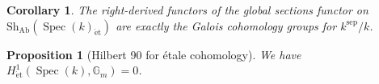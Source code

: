 \documentclass{article}
\numberwithin{equation}{section}
\numberwithin{figure}{section}
\newcommand{\G}{\mathbb{G}}
\newcommand{\Spec}{\mathop{\mathrm{Spec}}}
\newcommand{\et}{\acute{\mathrm{e}}\mathrm{t}}
\newcommand{\sep}{\mathrm{sep}}
\newcommand{\Ab}{\mathrm{Ab}}
\newcommand{\Sh}{\mathrm{Sh}}
\theoremstyle{plain}
\newtheorem{prop}[thm]{Proposition}
\newtheorem{cor}[thm]{Corollary}
\theoremstyle{definition}
\theoremstyle{remark}
\begin{document}
\begin{cor}
The right-derived functors of the global sections functor on $\Sh_{\Ab}(\Spec(k)_{\et})$ are exactly the Galois cohomology groups for $k^\sep/k$.
\end{cor}

\begin{prop}[Hilbert 90 for \'etale cohomology]
    We have $H^1_{\et}(\Spec(k), \G_m) = 0$.
\end{prop}
\newpage
\printbibliography
\end{document}
